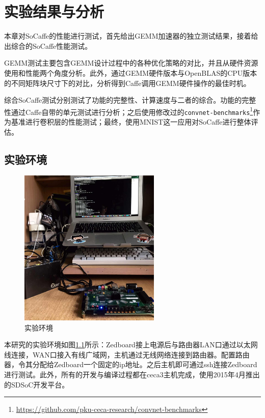 \chapter{实验结果与分析}

本章对SoCaffe的性能进行测试，首先给出GEMM加速器的独立测试结果，接着给出综合的SoCaffe性能测试。

GEMM测试主要包含GEMM设计过程中的各种优化策略的对比，并且从硬件资源使用和性能两个角度分析。此外，通过GEMM硬件版本与OpenBLAS的CPU版本的不同矩阵块尺寸下的对比，分析得到Caffe调用GEMM硬件操作的最佳时机。

综合SoCaffe测试分别测试了功能的完整性、计算速度与二者的综合。功能的完整性通过Caffe自带的单元测试进行分析；之后使用修改过的\texttt{convnet-benchmarks}\footnote{\url{https://github.com/pku-ceca-research/convnet-benchmarks}}作为基准进行卷积层的性能测试；最终，使用MNIST这一应用对SoCaffe进行整体评估。

\section{实验环境}

\begin{figure}[!ht]
	\centering	
	\includegraphics[width=0.6\textwidth]{assets/imgs/env.jpg}
	\caption{实验环境}
	\label{fig:env}
\end{figure}

本研究的实验环境如图\ref{fig:env}所示：Zedboard接上电源后与路由器LAN口通过以太网线连接，WAN口接入有线广域网，主机通过无线网络连接到路由器。配置路由器，令其分配给Zedboard一个固定的ip地址。之后主机即可通过ssh连接Zedboard进行测试。此外，所有的开发与编译过程都在ceca3主机完成，使用2015年4月推出的SDSoC开发平台。

